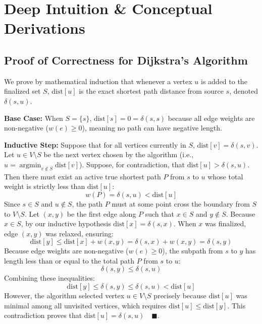 \section{Deep Intuition \& Conceptual Derivations}

\subsection{Proof of Correctness for Dijkstra's Algorithm}
We prove by mathematical induction that whenever a vertex $u$ is added to the finalized set $S$, $\text{dist}[u]$ is the exact shortest path distance from source $s$, denoted $\delta(s, u)$.

\textbf{Base Case:} When $S = \{s\}$, $\text{dist}[s] = 0 = \delta(s, s)$ because all edge weights are non-negative ($w(e) \ge 0$), meaning no path can have negative length.

\textbf{Inductive Step:} Suppose that for all vertices currently in $S$, $\text{dist}[v] = \delta(s, v)$. Let $u \in V \setminus S$ be the next vertex chosen by the algorithm (i.e., $u = \operatorname{argmin}_{v \notin S} \text{dist}[v]$).
Suppose, for contradiction, that $\text{dist}[u] > \delta(s, u)$. Then there must exist an active true shortest path $P$ from $s$ to $u$ whose total weight is strictly less than $\text{dist}[u]$:
\begin{equation}
w(P) = \delta(s, u) < \text{dist}[u]
\end{equation}
Since $s \in S$ and $u \notin S$, the path $P$ must at some point cross the boundary from $S$ to $V \setminus S$. Let $(x, y)$ be the first edge along $P$ such that $x \in S$ and $y \notin S$.
Because $x \in S$, by our inductive hypothesis $\text{dist}[x] = \delta(s, x)$. When $x$ was finalized, edge $(x, y)$ was relaxed, ensuring:
\begin{equation}
\text{dist}[y] \le \text{dist}[x] + w(x, y) = \delta(s, x) + w(x, y) = \delta(s, y)
\end{equation}
Because edge weights are non-negative ($w(e) \ge 0$), the subpath from $s$ to $y$ has length less than or equal to the total path $P$ from $s$ to $u$:
\begin{equation}
\delta(s, y) \le \delta(s, u)
\end{equation}
Combining these inequalities:
\begin{equation}
\text{dist}[y] \le \delta(s, y) \le \delta(s, u) < \text{dist}[u]
\end{equation}
However, the algorithm selected vertex $u \in V \setminus S$ precisely because $\text{dist}[u]$ was minimal among all unvisited vertices, which requires $\text{dist}[u] \le \text{dist}[y]$. This contradiction proves that $\text{dist}[u] = \delta(s, u) \quad \blacksquare$.

